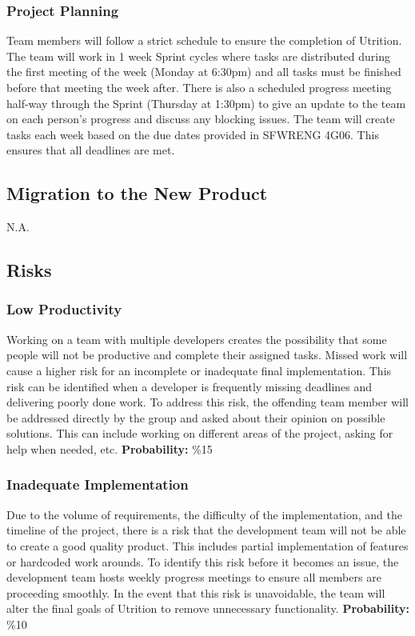 \documentclass[12pt]{article}
\begin{document}
{\subsubsection{Project Planning}
Team members will follow a strict schedule to ensure the completion of Utrition. The team will work in 1 week Sprint cycles where tasks are distributed during the first meeting of the week (Monday at 6:30pm) and all tasks must be finished before that meeting the week after. There is also a scheduled progress meeting half-way through the Sprint (Thursday at 1:30pm) to give an update to the team on each person's progress and discuss any blocking issues. The team will create tasks each week based on the due dates provided in SFWRENG 4G06. This ensures that all deadlines are met.

\subsection{Migration to the New Product}
N.A.

\subsection{Risks}
\subsubsection{Low Productivity}
Working on a team with multiple developers creates the possibility that some people will not be productive and complete their assigned tasks. Missed work will cause a higher risk for an incomplete or inadequate final implementation. This risk can be identified when a developer is frequently missing deadlines and delivering poorly done work. To address this risk, the offending team member will be addressed directly by the group and asked about their opinion on possible solutions. This can include working on different areas of the project, asking for help when needed, etc.\newline
\textbf{Probability:} \%15

\subsubsection{Inadequate Implementation}
Due to the volume of requirements, the difficulty of the implementation, and the timeline of the project, there is a risk that the development team will not be able to create a good quality product. This includes partial implementation of features or hardcoded work arounds. To identify this risk before it becomes an issue, the development team hosts weekly progress meetings to ensure all members are proceeding smoothly. In the event that this risk is unavoidable, the team will alter the final goals of Utrition to remove unnecessary functionality.\newline
\textbf{Probability:} \%10

}
\end{document}
